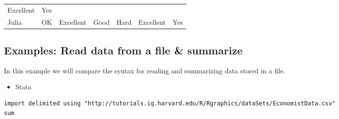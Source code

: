 \documentclass[]{book}
\providecommand{\tightlist}{%
  \setlength{\itemsep}{0pt}\setlength{\parskip}{0pt}}
\begin{document}
\begin{longtable}[]{@{}lllllll@{}}
\begin{minipage}[t]{0.17\columnwidth}
Excellent\strut
\end{minipage} & \begin{minipage}[t]{0.05\columnwidth}\raggedright\strut
Yes\strut
\end{minipage}\tabularnewline
\begin{minipage}[t]{0.08\columnwidth}\raggedright\strut
Julia\strut
\end{minipage} & \begin{minipage}[t]{0.11\columnwidth}\raggedright\strut
OK\strut
\end{minipage} & \begin{minipage}[t]{0.13\columnwidth}\raggedright\strut
Excellent\strut
\end{minipage} & \begin{minipage}[t]{0.16\columnwidth}\raggedright\strut
Good\strut
\end{minipage} & \begin{minipage}[t]{0.11\columnwidth}\raggedright\strut
Hard\strut
\end{minipage} & \begin{minipage}[t]{0.17\columnwidth}\raggedright\strut
Excellent\strut
\end{minipage} & \begin{minipage}[t]{0.05\columnwidth}\raggedright\strut
Yes\strut
\end{minipage}\tabularnewline
\bottomrule
\end{longtable}

\subsection{Examples: Read data from a file \&
summarize}\label{examples-read-data-from-a-file-summarize}

In this example we will compare the syntax for reading and summarizing
data stored in a file.

\begin{itemize}
\tightlist
\item
  Stata
\end{itemize}

\begin{verbatim}
import delimited using "http://tutorials.iq.harvard.edu/R/Rgraphics/dataSets/EconomistData.csv"
sum
\end{verbatim}
\end{document}
